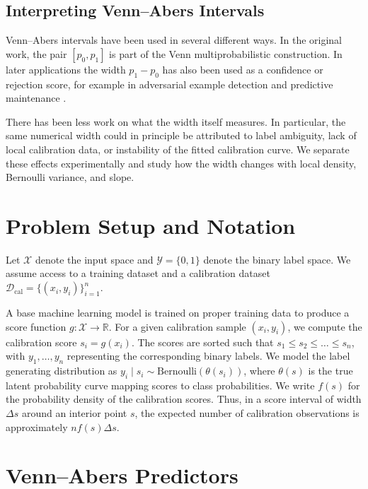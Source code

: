 \documentclass[11pt]{article}
\begin{document}
	\subsection{Interpreting Venn--Abers Intervals}
	Venn--Abers intervals have been used in several different ways. In the original work, the pair $[p_0,p_1]$ is part of the Venn multiprobabilistic construction. In later applications the width $p_1-p_0$ has also been used as a confidence or rejection score, for example in adversarial example detection \cite{peck2019} and predictive maintenance \cite{johansson2023}.

	There has been less work on what the width itself measures. In particular, the same numerical width could in principle be attributed to label ambiguity, lack of local calibration data, or instability of the fitted calibration curve. We separate these effects experimentally and study how the width changes with local density, Bernoulli variance, and slope.

\section{Problem Setup and Notation}
	\label{sec:setup}
	
	Let $\mathcal{X}$ denote the input space and $\mathcal{Y} = \{0, 1\}$ denote the binary label space. We assume access to a training dataset and a calibration dataset $\mathcal{D}_{\text{cal}} = \{(x_i, y_i)\}_{i=1}^n$. 
	
	A base machine learning model is trained on proper training data to produce a score function $g: \mathcal{X} \to \mathbb{R}$. For a given calibration sample $(x_i, y_i)$, we compute the calibration score $s_i = g(x_i)$. The scores are sorted such that $s_1 \le s_2 \le \dots \le s_n$, with $y_1, \dots, y_n$ representing the corresponding binary labels. We model the label generating distribution as $y_i \mid s_i \sim \text{Bernoulli}(\theta(s_i))$, where $\theta(s)$ is the true latent probability curve mapping scores to class probabilities. We write $f(s)$ for the probability density of the calibration scores. Thus, in a score interval of width $\Delta s$ around an interior point $s$, the expected number of calibration observations is approximately $n f(s)\Delta s$.
	
	\section{Venn--Abers Predictors}
	\label{sec:venn_abers}
	
\end{document}

